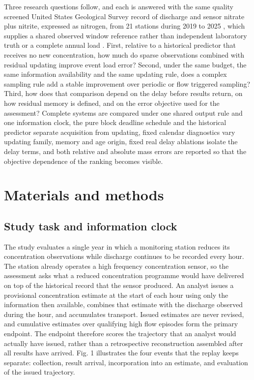 \documentclass[lineno,pdflatex,sn-apa]{sn-jnl}%
\theoremstyle{thmstyleone}%
\theoremstyle{thmstyletwo}%
\theoremstyle{thmstylethree}%
\begin{document}
Three research questions follow, and each is answered with the same quality screened United States Geological Survey record of discharge and sensor nitrate plus nitrite, expressed as nitrogen, from 21 stations during 2019 to 2025 \citep{usgs2026}, which supplies a shared observed window reference rather than independent laboratory truth or a complete annual load \citep{pellerin2013}. First, relative to a historical predictor that receives no new concentration, how much do sparse observations combined with residual updating improve event load error? Second, under the same budget, the same information availability and the same updating rule, does a complex sampling rule add a stable improvement over periodic or flow triggered sampling? Third, how does that comparison depend on the delay before results return, on how residual memory is defined, and on the error objective used for the assessment? Complete systems are compared under one shared output rule and one information clock, the pure block deadline schedule and the historical predictor separate acquisition from updating, fixed calendar diagnostics vary updating family, memory and age origin, fixed real delay ablations isolate the delay terms, and both relative and absolute mass errors are reported so that the objective dependence of the ranking becomes visible.

\section{Materials and methods}\label{sec:materialsandmethod}

\subsection{Study task and information clock}

The study evaluates a single year in which a monitoring station reduces its concentration observations while discharge continues to be recorded every hour. The station already operates a high frequency concentration sensor, so the assessment asks what a reduced concentration programme would have delivered on top of the historical record that the sensor produced. An analyst issues a provisional concentration estimate at the start of each hour using only the information then available, combines that estimate with the discharge observed during the hour, and accumulates transport. Issued estimates are never revised, and cumulative estimates over qualifying high flow episodes form the primary endpoint. The endpoint therefore scores the trajectory that an analyst would actually have issued, rather than a retrospective reconstruction assembled after all results have arrived. Fig. 1 illustrates the four events that the replay keeps separate: collection, result arrival, incorporation into an estimate, and evaluation of the issued trajectory.
\end{document}
